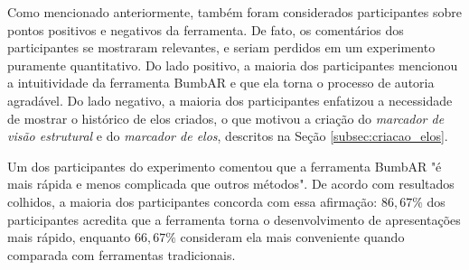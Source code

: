 \documentclass[../main.tex]{subfiles}
\begin{document}
Como mencionado anteriormente, também foram considerados participantes sobre pontos positivos e negativos da ferramenta. De fato, os comentários dos participantes se mostraram relevantes, e seriam perdidos em um experimento puramente quantitativo. Do lado positivo, a maioria dos participantes mencionou a intuitividade da ferramenta BumbAR e que ela torna o processo de autoria agradável. Do lado negativo, a maioria dos participantes enfatizou a necessidade de mostrar o histórico de elos criados, o que motivou a criação do \emph{marcador de visão estrutural} e do \emph{marcador de elos}, descritos na Seção \ref{subsec:criacao_elos}.

Um dos participantes do experimento comentou que a ferramenta BumbAR "é mais rápida e menos complicada que outros métodos". De acordo com resultados colhidos, a maioria dos participantes concorda com essa afirmação: $86,67\%$ dos participantes acredita que a ferramenta torna o desenvolvimento de apresentações mais rápido, enquanto $66,67\%$ consideram ela mais conveniente quando comparada com ferramentas tradicionais.
\end{document}
